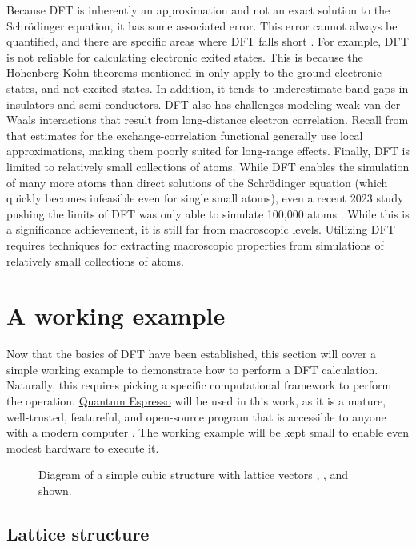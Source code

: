 Because DFT is inherently an approximation and not an exact solution to the
Schr\"odinger equation, it has some associated error. This error cannot always
be quantified, and there are specific areas where DFT falls short \cite{sholl}.
For example, DFT is not reliable for calculating electronic exited states. This
is because the Hohenberg-Kohn theorems mentioned in  only
apply to the ground electronic states, and not excited states. In addition, it
tends to underestimate band gaps in insulators and semi-conductors.
DFT also has challenges modeling weak van der Waals interactions that result
from long-distance electron correlation. Recall from  that
estimates for the exchange-correlation functional generally use local
approximations, making them poorly suited for long-range effects. Finally,
DFT is limited to relatively small collections of atoms. While DFT enables
the simulation of many more atoms than direct solutions of the Schr\"odinger
equation (which quickly becomes infeasible even for single small atoms), even
a recent 2023 study pushing the limits of DFT was only able to simulate 100,000
atoms \cite{dogan}. While this is a significance achievement, it is still far
from macroscopic levels. Utilizing DFT requires techniques for extracting
macroscopic properties from simulations of relatively  small
collections of atoms.

\section{A working example}

Now that the basics of DFT have been established, this section will cover a
simple working example to demonstrate how to perform a DFT calculation.
Naturally, this requires picking a specific computational framework to
perform the operation.
\href{https://www.quantum-espresso.org/}{Quantum Espresso} will be used in
this work, as it is a mature, well-trusted, featureful, and open-source
program that is accessible to anyone with a modern computer
\cite{quantum-espresso}. The working
example will be kept small to enable even modest hardware to execute it.

\begin{figure}
\centering

\caption{Diagram of a simple cubic structure with lattice vectors
\hkl[011], \hkl[101], and \hkl[110] shown.}
\label{fig:lattice}
\end{figure}

\subsection{Lattice structure}

